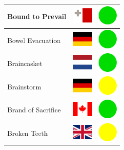 \documentclass[12pt, a4paper, twoside]{report}
\begin{document}
\begin{center}
\begin{longtable}{|p{5cm}|p{2cm}|p{2cm}|}
Bound to Prevail & \includegraphics[width=1cm]{4x3/mt} & \includegraphics[width=1cm]{likes/y} \\ \hline
Bowel Evacuation & \includegraphics[width=1cm]{4x3/de} & \includegraphics[width=1cm]{likes/y} \\ \hline
Braincasket & \includegraphics[width=1cm]{4x3/nl} & \includegraphics[width=1cm]{likes/y} \\ \hline
Brainstorm & \includegraphics[width=1cm]{4x3/de} & \includegraphics[width=1cm]{likes/m} \\ \hline
Brand of Sacrifice & \includegraphics[width=1cm]{4x3/ca} & \includegraphics[width=1cm]{likes/y} \\ \hline
Broken Teeth & \includegraphics[width=1cm]{4x3/gb} & \includegraphics[width=1cm]{likes/m} \\ \hline

\end{longtable}
\end{center}
\end{document}
